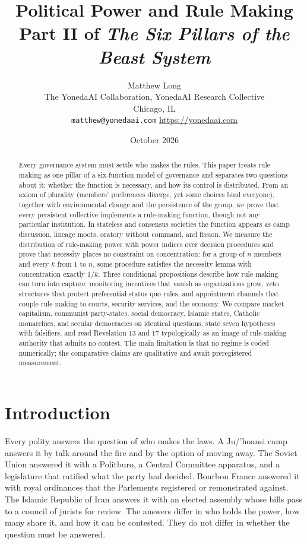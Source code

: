 \documentclass[11pt,letterpaper]{article}
\title{Political Power and Rule Making\\[4pt]
  {\normalsize Part II of \emph{The Six Pillars of the Beast System}}}
\author{Matthew Long\\
  \small The YonedaAI Collaboration, YonedaAI Research Collective\\
  \small Chicago, IL\\
  \small \texttt{matthew@yonedaai.com} \quad \url{https://yonedaai.com}}
\date{October 2026}
\theoremstyle{definition}
\theoremstyle{remark}
\begin{document}
\maketitle

\begin{abstract}
Every governance system must settle who makes the rules. This paper treats rule making as one pillar of a six-function model of governance and separates two questions about it: whether the function is necessary, and how its control is distributed. From an axiom of plurality (members' preferences diverge, yet some choices bind everyone), together with environmental change and the persistence of the group, we prove that every persistent collective implements a rule-making function, though not any particular institution. In stateless and consensus societies the function appears as camp discussion, lineage moots, oratory without command, and fission. We measure the distribution of rule-making power with power indices over decision procedures and prove that necessity places no constraint on concentration: for a group of $n$ members and every $k$ from $1$ to $n$, some procedure satisfies the necessity lemma with concentration exactly $1/k$. Three conditional propositions describe how rule making can turn into capture: monitoring incentives that vanish as organizations grow, veto structures that protect preferential status quo rules, and appointment channels that couple rule making to courts, security services, and the economy. We compare market capitalism, communist party-states, social democracy, Islamic states, Catholic monarchies, and secular democracies on identical questions, state seven hypotheses with falsifiers, and read Revelation 13 and 17 typologically as an image of rule-making authority that admits no contest. The main limitation is that no regime is coded numerically; the comparative claims are qualitative and await preregistered measurement.
\end{abstract}

\section{Introduction}
\label{sec:intro}

Every polity answers the question of who makes the laws. A Ju/'hoansi camp answers it by talk around the fire and by the option of moving away. The Soviet Union answered it with a Politburo, a Central Committee apparatus, and a legislature that ratified what the party had decided. Bourbon France answered it with royal ordinances that the Parlements registered or remonstrated against. The Islamic Republic of Iran answers it with an elected assembly whose bills pass to a council of jurists for review. The answers differ in who holds the power, how many share it, and how it can be contested. They do not differ in whether the question must be answered.
\end{document}
